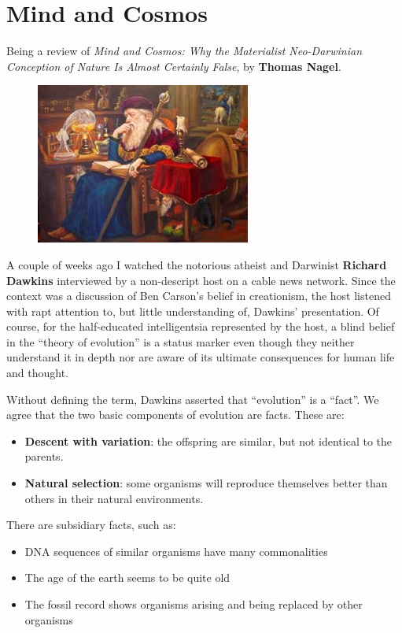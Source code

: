 \section{Mind and Cosmos}

Being a review of \emph{Mind and Cosmos: Why the Materialist Neo-Darwinian Conception of Nature Is Almost Certainly
False}, by \textbf{Thomas Nagel}.

\begin{figure}
 \includegraphics[scale=.5]{a20151111MindandCosmos-img001.jpg}
\end{figure}

A couple of weeks ago I watched the notorious atheist and Darwinist \textbf{Richard Dawkins} interviewed by a
non-descript host on a cable news network. Since the context was a discussion of Ben Carson's belief in
creationism, the host listened with rapt attention to, but little understanding of, Dawkins' presentation.
Of course, for the half-educated intelligentsia represented by the host, a blind belief in the “theory of evolution” is
a status marker even though they neither understand it in depth nor are aware of its ultimate consequences for human
life and thought.

Without defining the term, Dawkins asserted that “evolution” is a “fact”. We agree that the two basic components of
evolution are facts. These are:

\begin{itemize}
\item \textbf{Descent with variation}: the offspring are similar, but not identical to the parents. 
\item \textbf{Natural selection}: some organisms will reproduce themselves better than others in their natural
environments. 
\end{itemize}
There are subsidiary facts, such as:

\begin{itemize}
\item DNA sequences of similar organisms have many commonalities 
\item The age of the earth seems to be quite old 
\item The fossil record shows organisms arising and being replaced by other organisms 
\end{itemize}

